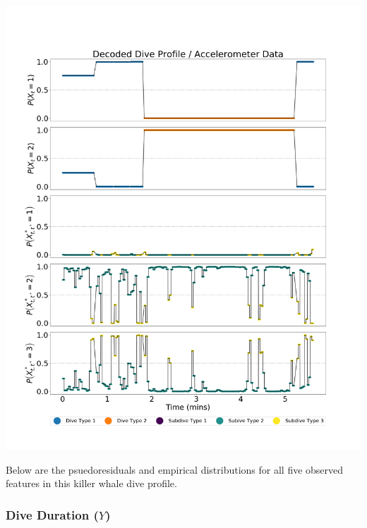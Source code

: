 \documentclass[12pt]{TD-CJS}
\begin{document}
\includegraphics[width=5.5in]{../Plots/CarHHMM1_decoded_states.png}
\newpage

Below are the psuedoresiduals and empirical distributions for all five observed features in this killer whale dive profile. 

\subsubsection{Dive Duration ($Y$)}
\end{document}
